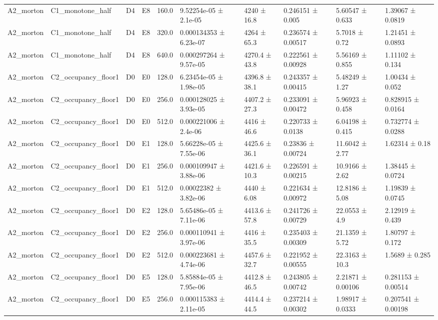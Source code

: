\begin{table}
\begin{tabular}{llllllllll}
A2\_morton & C1\_monotone\_half & D4 & E8 & 160.0 & 9.52254e-05 ± 2.1e-05 & 4240 ± 16.8 & 0.246151 ± 0.005 & 5.60547 ± 0.633 & 1.39067 ± 0.0819 \\
A2\_morton & C1\_monotone\_half & D4 & E8 & 320.0 & 0.000134353 ± 6.23e-07 & 4264 ± 65.3 & 0.236574 ± 0.00517 & 5.7018 ± 0.72 & 1.21451 ± 0.0893 \\
A2\_morton & C1\_monotone\_half & D4 & E8 & 640.0 & 0.000297264 ± 9.57e-05 & 4270.4 ± 43.8 & 0.222561 ± 0.00928 & 5.56169 ± 0.855 & 1.11102 ± 0.134 \\
A2\_morton & C2\_occupancy\_floor1 & D0 & E0 & 128.0 & 6.23454e-05 ± 1.98e-05 & 4396.8 ± 38.1 & 0.243357 ± 0.00415 & 5.48249 ± 1.27 & 1.00434 ± 0.052 \\
A2\_morton & C2\_occupancy\_floor1 & D0 & E0 & 256.0 & 0.000128025 ± 3.93e-05 & 4407.2 ± 27.3 & 0.233091 ± 0.00472 & 5.96923 ± 0.458 & 0.828915 ± 0.0164 \\
A2\_morton & C2\_occupancy\_floor1 & D0 & E0 & 512.0 & 0.000221006 ± 2.4e-06 & 4416 ± 46.6 & 0.220733 ± 0.0138 & 6.04198 ± 0.415 & 0.732774 ± 0.0288 \\
A2\_morton & C2\_occupancy\_floor1 & D0 & E1 & 128.0 & 5.66228e-05 ± 7.55e-06 & 4425.6 ± 36.1 & 0.23836 ± 0.00724 & 11.6042 ± 2.77 & 1.62314 ± 0.18 \\
A2\_morton & C2\_occupancy\_floor1 & D0 & E1 & 256.0 & 0.000109947 ± 3.88e-06 & 4421.6 ± 10.3 & 0.226591 ± 0.00215 & 10.9166 ± 2.62 & 1.38445 ± 0.0724 \\
A2\_morton & C2\_occupancy\_floor1 & D0 & E1 & 512.0 & 0.00022382 ± 3.82e-06 & 4440 ± 6.08 & 0.221634 ± 0.00972 & 12.8186 ± 5.08 & 1.19839 ± 0.0745 \\
A2\_morton & C2\_occupancy\_floor1 & D0 & E2 & 128.0 & 5.65486e-05 ± 7.11e-06 & 4413.6 ± 57.8 & 0.241726 ± 0.00729 & 22.0553 ± 4.9 & 2.12919 ± 0.439 \\
A2\_morton & C2\_occupancy\_floor1 & D0 & E2 & 256.0 & 0.000110941 ± 3.97e-06 & 4416 ± 35.5 & 0.235403 ± 0.00309 & 21.1359 ± 5.72 & 1.80797 ± 0.172 \\
A2\_morton & C2\_occupancy\_floor1 & D0 & E2 & 512.0 & 0.000223681 ± 4.74e-06 & 4457.6 ± 32.7 & 0.221952 ± 0.00555 & 22.3163 ± 10.3 & 1.5689 ± 0.285 \\
A2\_morton & C2\_occupancy\_floor1 & D0 & E5 & 128.0 & 5.85884e-05 ± 7.95e-06 & 4412.8 ± 46.5 & 0.243805 ± 0.00742 & 2.21871 ± 0.00106 & 0.281153 ± 0.00514 \\
A2\_morton & C2\_occupancy\_floor1 & D0 & E5 & 256.0 & 0.000115383 ± 2.11e-05 & 4414.4 ± 44.5 & 0.237214 ± 0.00302 & 1.98917 ± 0.0333 & 0.207541 ± 0.00198 \\

\end{tabular}
\end{table}
